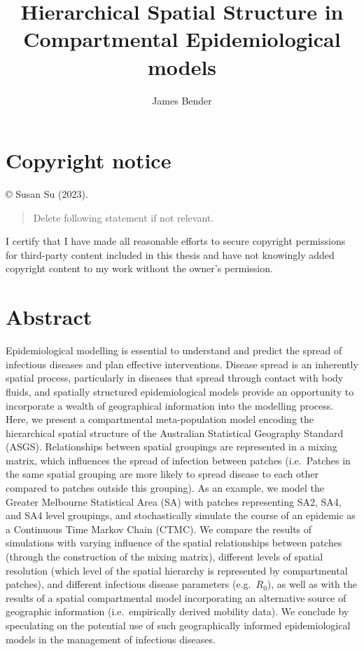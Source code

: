 \documentclass{monashthesis}
\author{James Bender}
\title{Hierarchical Spatial Structure in Compartmental Epidemiological
models}
\begin{document}

\titlepage

{\sf\tighttoc\doublespacing}


\hypertarget{copyright-notice}{%
\chapter*{Copyright notice}\label{copyright-notice}}


© Susan Su (2023).

\begin{quote}
Delete following statement if not relevant.
\end{quote}

I certify that I have made all reasonable efforts to secure copyright
permissions for third-party content included in this thesis and have not
knowingly added copyright content to my work without the owner's
permission.


\hypertarget{abstract}{%
\chapter*{Abstract}\label{abstract}}


Epidemiological modelling is essential to understand and predict the
spread of infectious diseases and plan effective interventions. Disease
spread is an inherently spatial process, particularly in diseases that
spread through contact with body fluids, and spatially structured
epidemiological models provide an opportunity to incorporate a wealth of
geographical information into the modelling process. Here, we present a
compartmental meta-population model encoding the hierarchical spatial
structure of the Australian Statistical Geography Standard (ASGS).
Relationships between spatial groupings are represented in a mixing
matrix, which influences the spread of infection between patches
(i.e.~Patches in the same spatial grouping are more likely to spread
disease to each other compared to patches outside this grouping). As an
example, we model the Greater Melbourne Statistical Area (SA) with
patches representing SA2, SA4, and SA4 level groupings, and
stochastically simulate the course of an epidemic as a Continuous Time
Markov Chain (CTMC). We compare the results of simulations with varying
influence of the spatial relationships between patches (through the
construction of the mixing matrix), different levels of spatial
resolution (which level of the spatial hierarchy is represented by
compartmental patches), and different infectious disease parameters
(e.g.~\(R_0\)), as well as with the results of a spatial compartmental
model incorporating an alternative source of geographic information
(i.e.~empirically derived mobility data). We conclude by speculating on
the potential use of such geographically informed epidemiological models
in the management of infectious diseases.
\end{document}
